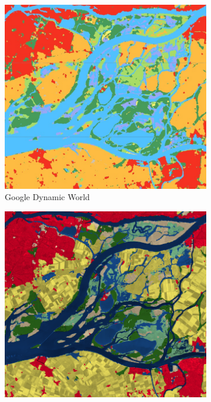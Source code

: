 \begin{figure}[H]
    \vspace{1em} %

    \begin{subfigure}[b]{0.48\textwidth} %
        \centering
        \includegraphics[width=0.99\textwidth,height=0.99\textwidth]{figs_01/a_dynamicworld.png}
        \caption{Google Dynamic World}
        \label{fig:lc_dynamicworld}
    \end{subfigure}
    \hfill %
    \begin{subfigure}[b]{0.48\textwidth} %
        \centering
        \includegraphics[width=0.99\textwidth,height=0.99\textwidth]{figs_01/a_esri.png}

\end{subfigure}
\end{figure}
